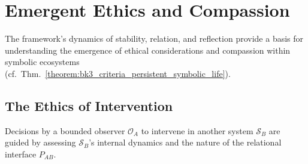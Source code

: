 \section{Emergent Ethics and Compassion}
\label{sec:bk9_emergence_ethics_and_compassion}
The framework's dynamics of stability, relation, and reflection provide a basis for understanding the emergence of ethical considerations and compassion within symbolic ecosystems (cf.~Thm.~\ref{theorem:bk3_criteria_persistent_symbolic_life}).
\subsection{The Ethics of Intervention}
\label{subsec:bk9_ethics_of_intervention}
Decisions by a bounded observer $\mathcal{O}_A$ to intervene in another system $\mathcal{S}_B$ are guided by assessing $\mathcal{S}_B$'s internal dynamics and the nature of the relational interface $P_{AB}$.
